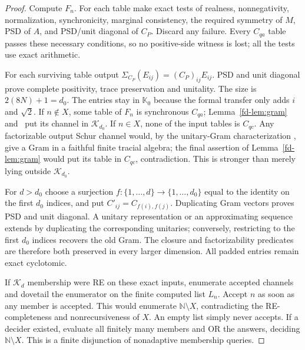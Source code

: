 \documentclass[11pt]{article}
\theoremstyle{definition}
\theoremstyle{remark}
\providecommand{\K}{\mathcal K}
\begin{document}
\begin{proof}
Compute $F_n$. For each table make exact tests of realness, nonnegativity, normalization, synchronicity, marginal consistency, the required symmetry of $M$, PSD of $A$, and PSD/unit diagonal of $C_P$. Discard any failure. Every $C_{qa}$ table passes these necessary conditions, so no positive-side witness is lost; all the tests use exact arithmetic.

For each surviving table output $\Sigma_{C_P}(E_{ij})=(C_P)_{ij}E_{ij}$. PSD and unit diagonal prove complete positivity, trace preservation and unitality. The size is $2(8N)+1=d_0$. The entries stay in $\mathbb K_0$ because the formal transfer only adds $i$ and $\sqrt2$. If $n\notin X$, some table of $F_n$ is synchronous $C_{qa}$; Lemma~\ref{fd-lem:gram} and~\cite[Prop.~3.9(iii)]{Musat25} put its channel in $\K_{d_0}$. If $n\in X$, none of the input tables is $C_{qc}$. Any factorizable output Schur channel would, by the unitary-Gram characterization \cite[Prop.~3.9(i)]{Musat25}, give a Gram in a faithful finite tracial algebra; the final assertion of Lemma~\ref{fd-lem:gram} would put its table in $C_{qc}$, contradiction. This is stronger than merely lying outside $\K_{d_0}$.

For $d>d_0$ choose a surjection $f:\{1,\ldots,d\}\to\{1,\ldots,d_0\}$ equal to the identity on the first $d_0$ indices, and put $C'_{ij}=C_{f(i),f(j)}$. Duplicating Gram vectors proves PSD and unit diagonal. A unitary representation or an approximating sequence extends by duplicating the corresponding unitaries; conversely, restricting to the first $d_0$ indices recovers the old Gram. The closure and factorizability predicates are therefore both preserved in every larger dimension. All padded entries remain exact cyclotomic.

If $\K_d$ membership were RE on these exact inputs, enumerate accepted channels and dovetail the enumerator on the finite computed list $L_n$. Accept $n$ as soon as any member is accepted. This would enumerate $\mathbb N\setminus X$, contradicting the RE-completeness and nonrecursiveness of $X$. An empty list simply never accepts. If a decider existed, evaluate all finitely many members and OR the answers, deciding $\mathbb N\setminus X$. This is a finite disjunction of nonadaptive membership queries.
\end{proof}
\end{document}
